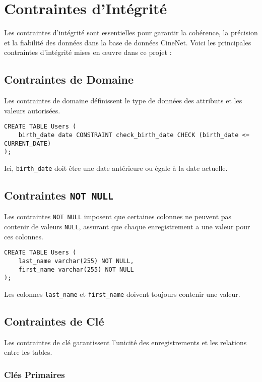 \section{Contraintes d'Intégrité}

Les contraintes d'intégrité sont essentielles pour garantir la cohérence, la précision et la fiabilité des données dans la base de données CineNet. Voici les principales contraintes d'intégrité mises en œuvre dans ce projet :

\subsection*{Contraintes de Domaine}

Les contraintes de domaine définissent le type de données des attributs et les valeurs autorisées.

\begin{lstlisting}
CREATE TABLE Users (
    birth_date date CONSTRAINT check_birth_date CHECK (birth_date <= CURRENT_DATE)
);
\end{lstlisting}

Ici, \texttt{birth\_date} doit être une date antérieure ou égale à la date actuelle.

\subsection*{Contraintes \texttt{NOT NULL}}

Les contraintes \texttt{NOT NULL} imposent que certaines colonnes ne peuvent pas contenir de valeurs \texttt{NULL}, assurant que chaque enregistrement a une valeur pour ces colonnes.

\begin{lstlisting}
CREATE TABLE Users (
    last_name varchar(255) NOT NULL,
    first_name varchar(255) NOT NULL
);
\end{lstlisting}

Les colonnes \texttt{last\_name} et \texttt{first\_name} doivent toujours contenir une valeur.

\subsection*{Contraintes de Clé}

Les contraintes de clé garantissent l'unicité des enregistrements et les relations entre les tables.

\subsubsection*{Clés Primaires}

